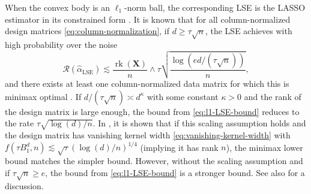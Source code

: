 \documentclass[a4paper]{article}
\newcommand{\pr}[1]{\left(#1\right)}
\newcommand{\X}[0]{\mathbf{X}}
\newcommand{\cR}[0]{\mathcal{R}}
\newcommand{\ha}[0]{\widehat{\alpha}}
\DeclareMathOperator{\LSEOp}{LSE}
\newcommand{\haLSE}[0]{\ha_{{\LSEOp}}}
\DeclareMathOperator{\rankOp}{rk}
\newcommand{\rank}[1]{\rankOp\pr{#1}}
\theoremstyle{thmstyle}
\theoremstyle{defstyle}
\theoremstyle{remark}
\begin{document}
When the convex body is an $\ell_1$-norm ball, the corresponding LSE is the LASSO estimator in its constrained form \citep{Tibshirani1996lasso}. It is known \citep[Thm. 7]{Bellec2017localizedgaussianwidthmconvex} that for all column-normalized design matrices \eqref{eq:column-normalization}, if $d\geq \tau \sqrt{n}$, the LSE achieves with high probability over the noise
\begin{equation}
\label{eq:l1-LSE-bound}
     \cR(\haLSE)\lesssim \frac{\rank{\X}}{n} \wedge \tau\sqrt{\frac{\log (ed/(\tau \sqrt{n}))}{n}},
\end{equation}
and there exists at least one column-normalized data matrix for which this is minimax optimal \citep[Thm. 5.3 and Eq. 5.25]{Rigollet2010exponentialscreeningoptimalrates}. 
If $d/(\tau\sqrt{n})\asymp d^\kappa$ with some constant $\kappa>0$ and the rank of the design matrix is large enough, the bound from \eqref{eq:l1-LSE-bound} reduces to the rate $\tau \sqrt{\log(d)/n}$. In \cite[Thm. 3]{Raskutti2011}, it is shown that if this scaling assumption holds and the design matrix has vanishing kernel width \eqref{eq:vanishing-kernel-width} with $f(\tau B_1^d,n)\lesssim \sqrt{\tau}\pr{\log(d)/n}^{1/4}$ (implying it has rank $n$), the minimax lower bound matches the simpler bound.
However, without the scaling assumption and if $\tau\sqrt{n}\geq e$, the bound from \eqref{eq:l1-LSE-bound} is a stronger bound. See also \citet[pgs. 16-17]{Rigollet2010exponentialscreeningoptimalrates} for a discussion.
\end{document}
